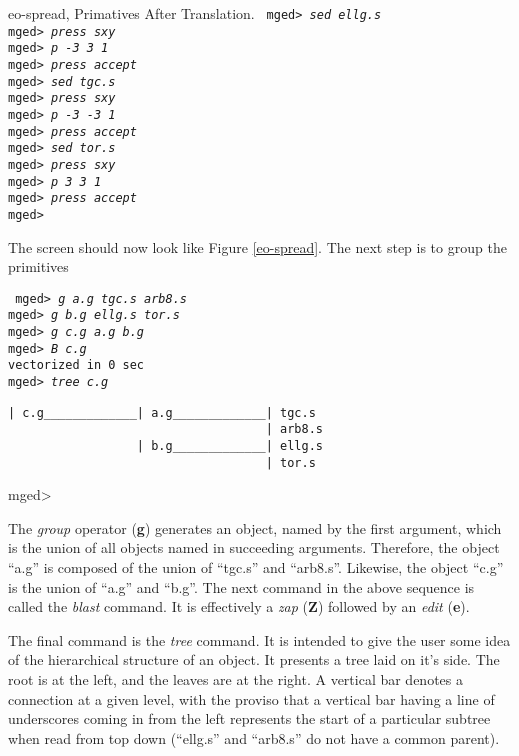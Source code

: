 \mfig eo-spread, Primatives After Translation.
\noindent
{\tt
mged> {\em sed ellg.s}\\
mged> {\em press sxy}\\
mged> {\em p -3 3 1}\\
mged> {\em press accept}\\
mged> {\em sed tgc.s}\\
mged> {\em press sxy}\\
mged> {\em p -3 -3 1}\\
mged> {\em press accept}\\
mged> {\em sed tor.s}\\
mged> {\em press sxy}\\
mged> {\em p 3 3 1}\\
mged> {\em press accept}\\
mged>\\
}

The screen should now look like Figure \ref{eo-spread}.  The next step
is to group the primitives

\noindent
{\tt
mged> {\em g a.g tgc.s arb8.s}\\
mged> {\em g b.g ellg.s tor.s}\\
mged> {\em g c.g a.g b.g}\\
mged> {\em B c.g}\\
vectorized in 0 sec\\
mged> {\em tree c.g}
\begin{verbatim}
| c.g_____________| a.g_____________| tgc.s
                                    | arb8.s
                  | b.g_____________| ellg.s
                                    | tor.s
\end{verbatim}
\noindent
mged>\\
}

The {\em group} operator ({\bf g}) generates an object, named by the
first argument, which is the union of all objects named in succeeding
arguments.  Therefore, the object ``a.g'' is composed of the union of
``tgc.s'' and ``arb8.s''.  Likewise, the object ``c.g'' is the union of
``a.g'' and ``b.g''.  The next command in the above sequence is called
the {\em blast} command.  It is effectively a {\em zap} ({\bf Z})
followed by an {\em edit} ({\bf e}).

The final command is the {\em tree} command.  It is intended to give the
user some idea of the hierarchical structure of an object.  It presents
a tree laid on it's side.  The root is at the left, and the leaves are
at the right. A vertical bar denotes a connection at a given level, with
the proviso that a vertical bar having a line of underscores coming
in from the left represents the start of a particular subtree when read
from top down (``ellg.s'' and ``arb8.s'' do not have a common parent).

